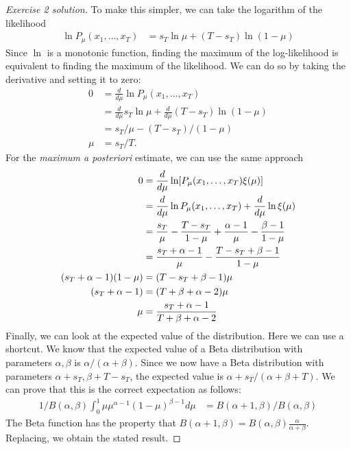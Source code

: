 \documentclass[twoside,a4paper]{article}
\begin{document}
  \begin{proof}[Exercise 2 solution]
    To make this simpler, we can take the logarithm of the likelihood
    \begin{align*}
      \ln P_\mu(x_1, \ldots, x_T)
      &=  s_T \ln \mu + (T - s_T) \ln (1 - \mu)
    \end{align*}
    Since $\ln$ is a monotonic function, finding the maximum of the log-likelihood is equivalent to finding the maximum of the likelihood. We can do so by taking the derivative and setting it to zero:
    \begin{align*}
      0 &= \frac{d}{d\mu} \ln P_\mu(x_1, \ldots, x_T)\\
        &=  \frac{d}{d\mu} s_T \ln \mu + \frac{d}{d\mu}  (T - s_T) \ln (1 - \mu)\\
        &=   s_T/\mu  - (T - s_T) / (1 - \mu)\\
      \mu &=   s_T /T.
    \end{align*}
    For the \emph{maximum a posteriori} estimate, we can use the same approach
    \begin{align*}
      0 &=\frac{d}{d\mu} \ln [P_\mu(x_1, \ldots, x_T) \xi(\mu)]\\
      &=
        \frac{d}{d\mu} \ln P_\mu(x_1, \ldots, x_T) + \frac{d}{d\mu} \ln \xi(\mu)\\
      &=
        \frac{s_T}{\mu} - \frac{T - s_T}{1 - \mu}
        +
        \frac{\alpha - 1}{\mu} -  \frac{\beta - 1}{1 - \mu}\\
      &=
        \frac{s_T + \alpha - 1}{\mu}  - \frac{T - s_T + \beta - 1}{1 - \mu}\\
      (s_T + \alpha - 1)(1 - \mu) &= (T - s_T + \beta - 1) \mu\\
      (s_T + \alpha - 1)  &= (T + \beta + \alpha - 2 ) \mu\\
      \mu & = \frac{s_T + \alpha - 1}{T + \beta + \alpha - 2 }
    \end{align*}
    Finally, we can look at the expected value of the distribution. Here we can use a shortcut. We know that the expected value of a Beta distribution with parameters $\alpha, \beta$ is $\alpha / (\alpha + \beta)$. Since we now have a Beta distribution with parameters $\alpha + s_T, \beta + T - s_T$, the expected value is $\alpha + s_T / (\alpha + \beta + T)$. We can prove that this is the
    correct expectation as follows:
    \begin{align*}
      1/B(\alpha, \beta)
      \int_0^1
      \mu \mu^{\alpha- 1}
      (1 - \mu)^{\beta - 1} d\mu
      &=
        B(\alpha + 1, \beta)/B(\alpha, \beta)
    \end{align*}
    The Beta function has the property that $B(\alpha + 1, \beta) = B(\alpha, \beta) \frac{\alpha}{\alpha + \beta}$. Replacing, we obtain the stated result.
  \end{proof}
\fi
\end{document}
